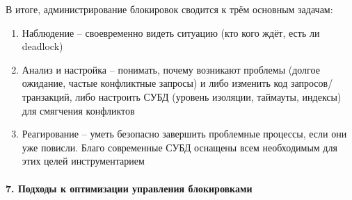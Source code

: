  В итоге, администрирование блокировок сводится к трём основным задачам: 
 \begin{enumerate}
    \item Наблюдение – своевременно видеть ситуацию (кто кого ждёт, есть ли deadlock)
    \item Анализ и настройка – понимать, почему возникают проблемы (долгое ожидание, частые конфликтные запросы) и либо изменить код запросов/транзакций, либо настроить СУБД (уровень изоляции, таймауты, индексы) для смягчения конфликтов
    \item Реагирование – уметь безопасно завершить проблемные процессы, если они уже повисли. Благо современные СУБД оснащены всем необходимым для этих целей инструментарием
 \end{enumerate}

\paragraph{7. Подходы к оптимизации управления блокировками} ~\\

